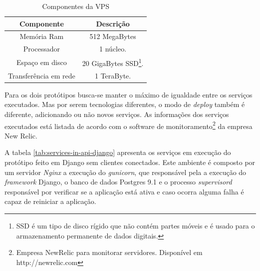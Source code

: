   \begin{table}[H]
    \centering
    \footnotesize
    \setlength{\abovecaptionskip}{0pt}
    \setlength{\belowcaptionskip}{0pt}
    \caption[Componentes da VPS]{Componentes da VPS}
    \label{tab:components-digital-ocean-vps}
    \begin{tabular}{c|c}
      \hline \hline
      Componente  &	Descrição \\
      \hline \hline
      Memória Ram & 512 MegaBytes \\
      Processador & 1 núcleo. \\
      Espaço em disco & 20 GigaBytes SSD\footnote{SSD é um tipo de disco rígido que não contém partes móveis e é usado para o armazenamento permanente de dados digitais.}. \\
      Transferência em rede & 1 TeraByte. \\
      \hline \hline
    \end{tabular}
  \end{table}

  Para os dois protótipos busca-se manter o máximo de igualdade entre os serviços executados. Mas por serem 
  tecnologias diferentes, o modo de \textit{deploy} também é diferente, adicionando ou não novos serviços. 
  As informações dos serviços executados está listada de acordo com o software de monitoramento\footnote{ Empresa NewRelic para monitorar servidores. Disponível em http://newrelic.com}
  da empresa New Relic.
  
  A tabela \ref{tab:services-in-api-django} apresenta os serviços em execução do protótipo feito em Django sem clientes conectados.
  Este ambiente é composto por um servidor \textit{Nginx} a execução do \textit{gunicorn},
  que responsável pela a execução do \textit{framework} Django, o banco de dados Postgres 9.1 e o processo \textit{supervisord} responsável por
  verificar se a aplicação está ativa e caso ocorra alguma falha é capaz de reiniciar a aplicação.
  
